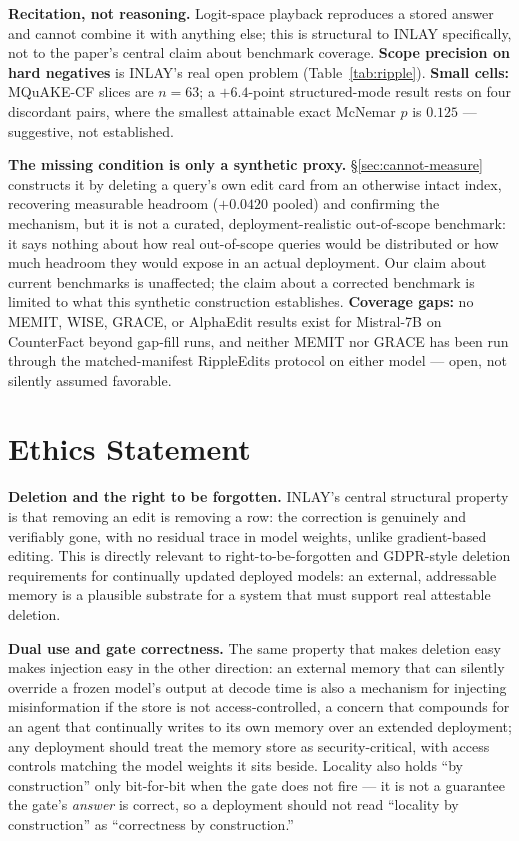\documentclass{article}
\begin{document}
\textbf{Recitation, not reasoning.} Logit-space playback reproduces a
stored answer and cannot combine it with anything else; this is structural
to INLAY specifically, not to the paper's central claim about benchmark
coverage. \textbf{Scope precision on hard negatives} is INLAY's real open
problem (Table~\ref{tab:ripple}). \textbf{Small cells:} MQuAKE-CF slices are
$n{=}63$; a $+6.4$-point structured-mode result rests on four discordant
pairs, where the smallest attainable exact McNemar $p$ is $0.125$ ---
suggestive, not established.

\textbf{The missing condition is only a synthetic proxy.}
\S\ref{sec:cannot-measure} constructs it by deleting a query's own edit
card from an otherwise intact index, recovering measurable headroom
($+0.0420$ pooled) and confirming the mechanism, but it is not a curated,
deployment-realistic out-of-scope benchmark: it says nothing about how
real out-of-scope queries would be distributed or how much headroom they
would expose in an actual deployment. Our claim about current benchmarks
is unaffected; the claim about a corrected benchmark is limited to what
this synthetic construction establishes. \textbf{Coverage gaps:} no MEMIT,
WISE, GRACE, or AlphaEdit results exist for Mistral-7B on CounterFact
beyond gap-fill runs, and neither MEMIT nor GRACE has been run through the
matched-manifest RippleEdits protocol on either model --- open, not
silently assumed favorable.

\section*{Ethics Statement}

\textbf{Deletion and the right to be forgotten.} INLAY's central structural
property is that removing an edit is removing a row: the correction is
genuinely and verifiably gone, with no residual trace in model weights,
unlike gradient-based editing. This is directly relevant to
right-to-be-forgotten and GDPR-style deletion requirements for continually
updated deployed models: an external, addressable memory is a plausible
substrate for a system that must support real attestable deletion.

\textbf{Dual use and gate correctness.} The same property that makes
deletion easy makes injection easy in the other direction: an external
memory that can silently override a frozen model's output at decode time
is also a mechanism for injecting misinformation if the store is not
access-controlled, a concern that compounds for an agent that continually
writes to its own memory over an extended deployment; any deployment
should treat the memory store as security-critical, with access controls
matching the model weights it sits beside. Locality also holds ``by
construction'' only bit-for-bit when the gate does not fire --- it is not
a guarantee the gate's \emph{answer} is correct, so a deployment should not
read ``locality by construction'' as ``correctness by construction.''
\end{document}

